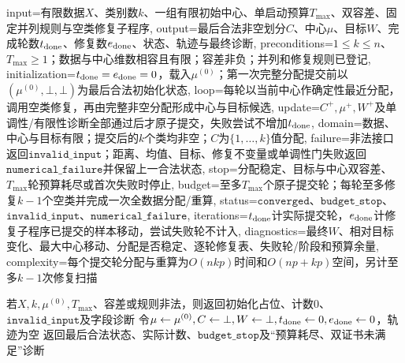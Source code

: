 \begin{AlgorithmContract}{
  input={有限数据$X$、类别数$k$、一组有限初始中心、单启动预算$T_{\max}$、双容差、固定并列规则与空类修复子程序},
  output={最后合法非空划分$C$、中心$\mu$、目标$W$、完成轮数$t_{\rm done}$、修复数$e_{\rm done}$、状态、轨迹与最终诊断},
  preconditions={$1\le k\le n$、$T_{\max}\ge1$；数据与中心维数相容且有限；容差非负；并列和修复规则已登记},
  initialization={$t_{\rm done}=e_{\rm done}=0$，载入$\mu^{(0)}$；第一次完整分配提交前以$(\mu^{(0)},\bot,\bot)$为最后合法初始化状态},
  loop={每轮以当前中心作确定性最近分配，调用空类修复，再由完整非空分配形成中心与目标候选},
  update={$C^+,\mu^+,W^+$及单调性/有限性诊断全部通过后才原子提交，失败尝试不增加$t_{\rm done}$},
  domain={数据、中心与目标有限；提交后的$k$个类均非空；$C$为$\{1,\ldots,k\}$值分配},
  failure={非法接口返回$\mathtt{invalid\_input}$；距离、均值、目标、修复不变量或单调性门失败返回$\mathtt{numerical\_failure}$并保留上一合法状态},
  stop={分配稳定、目标与中心双容差、$T_{\max}$轮预算耗尽或首次失败时停止},
  budget={至多$T_{\max}$个原子提交轮；每轮至多修复$k-1$个空类并完成一次全数据分配/重算},
  status={$\mathtt{converged}$、$\mathtt{budget\_stop}$、$\mathtt{invalid\_input}$、$\mathtt{numerical\_failure}$},
  iterations={$t_{\rm done}$计实际提交轮，$e_{\rm done}$计修复子程序已提交的样本移动，尝试失败轮不计入},
  diagnostics={最终$W$、相对目标变化、最大中心移动、分配是否稳定、逐轮修复表、失败轮/阶段和预算余量},
  complexity={每个提交轮分配与重算为$O(nkp)$时间和$O(np+kp)$空间，另计至多$k-1$次修复扫描}
}
\begin{algorithm}[H]
\caption{带空类保护的单启动\kMeans{}}\label{alg:V4-C02-kmeans}
若$X,k,\mu^{(0)},T_{\max}$、容差或规则非法，则返回初始化占位、计数$0$、$\mathtt{invalid\_input}$及字段诊断\;
令$\mu\leftarrow\mu^{(0)},C\leftarrow\bot,W\leftarrow\bot,t_{\rm done}\leftarrow0,e_{\rm done}\leftarrow0$，轨迹为空\;
返回最后合法状态、实际计数、$\mathtt{budget\_stop}$及“预算耗尽、双证书未满足”诊断\;
\end{algorithm}
\end{AlgorithmContract}
\endgroup

